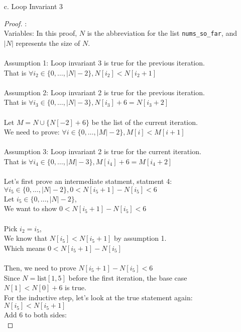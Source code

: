 \documentclass[fontsize=11pt]{article}
\begin{document}
\begin{enumerate}
\begin{enumerate}
\item[c.] Loop Invariant 3
\begin{proof} : \\
Variables: In this proof, $N$ is the abbreviation for the list \texttt{nums\_so\_far}, and $|N|$ represents the size of $N$. \\
\\
Assumption 1: Loop invariant 3 is true for the previous iteration. \\
That is $\forall i_2 \in \{0, \dots, |N| - 2\}, N[i_2] <  N[i_2 + 1]$ \\
\\
Assumption 2: Loop invariant 2 is true for the previous iteration. \\
That is $\forall i_3 \in \{0, \dots, |N| - 3\}, N[i_3] + 6 = N[i_3 + 2]$ \\
\\
Let $M = N \cup \{ N[-2] + 6 \}$ be the list of the current iteration. \\
We need to prove: $\forall i \in \{0, \dots, |M| - 2\}, M[i] < M[i + 1] $ \\
\\
Assumption 3: Loop invariant 2 is true for the current iteration. \\
That is $\forall i_4 \in \{0, \dots, |M| - 3\}, M[i_4] + 6 = M[i_4 + 2]$ \\
\\
Let's first prove an intermediate statment, statment 4: \\
$\forall i_5 \in \{0, \dots, |N| - 2\}, 0 < N[i_5 + 1] - N[i_5] < 6$ \\
Let $i_5 \in \{0, \dots, |N| - 2\}$, \\
We want to show $0 < N[i_5 + 1] - N[i_5] < 6$ \\
\\
Pick $i_2 = i_5$, \\
We know that $N[i_5] < N[i_5 + 1]$ by assumption 1. \\
Which means $0 < N[i_5 + 1] - N[i_5]$ \\
\\
Then, we need to prove $N[i_5 + 1] - N[i_5] < 6$ \\
Since $N = \text{list}[1, 5]$ before the first iteration, the base case $N[1] < N[0] + 6$ is true. \\
For the inductive step, let's look at the true statement again: \\
$N[i_5] < N[i_5 + 1]$ \\
Add 6 to both sides: \\

\end{proof}
\end{enumerate}
\end{enumerate}
\end{document}
